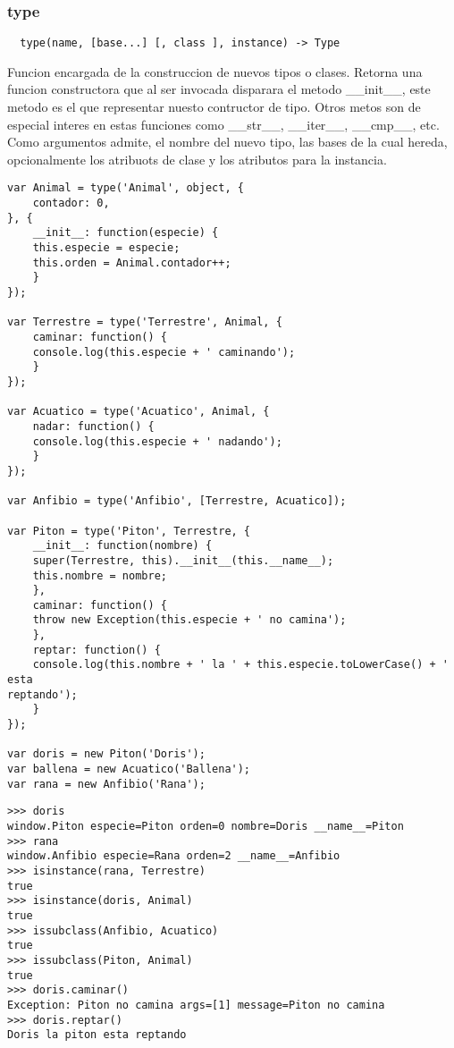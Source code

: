 \subsubsection*{type}
\begin{verbatim}
  type(name, [base...] [, class ], instance) -> Type
\end{verbatim} 
Funcion encargada de la construccion de nuevos tipos o clases.
Retorna una funcion constructora que al ser invocada disparara el metodo
__init__, este metodo es el que representar nuesto contructor de tipo. Otros
metos son de especial interes en estas funciones como __str__, __iter__,
__cmp__, etc.
Como argumentos admite, el nombre del nuevo tipo, las bases de la cual hereda,
opcionalmente los atribuots de clase y los atributos para la instancia.
\begin{lstlisting}[style=javascript,label=definicion-de-tipos,caption=Definicion
de tipos]
var Animal = type('Animal', object, {
    contador: 0,
}, {
    __init__: function(especie) {
	this.especie = especie;
	this.orden = Animal.contador++;
    }
});

var Terrestre = type('Terrestre', Animal, {
    caminar: function() {
	console.log(this.especie + ' caminando');
    }
});

var Acuatico = type('Acuatico', Animal, {
    nadar: function() {
	console.log(this.especie + ' nadando');
    }
});

var Anfibio = type('Anfibio', [Terrestre, Acuatico]);

var Piton = type('Piton', Terrestre, {
    __init__: function(nombre) {
	super(Terrestre, this).__init__(this.__name__);
	this.nombre = nombre;
    },
    caminar: function() {
	throw new Exception(this.especie + ' no camina');
    },
    reptar: function() {
	console.log(this.nombre + ' la ' + this.especie.toLowerCase() + ' esta
reptando');
    }
});

var doris = new Piton('Doris');
var ballena = new Acuatico('Ballena');
var rana = new Anfibio('Rana');
\end{lstlisting}
\begin{lstlisting}[style=consola]
>>> doris
window.Piton especie=Piton orden=0 nombre=Doris __name__=Piton
>>> rana
window.Anfibio especie=Rana orden=2 __name__=Anfibio
>>> isinstance(rana, Terrestre)
true
>>> isinstance(doris, Animal)
true
>>> issubclass(Anfibio, Acuatico)
true
>>> issubclass(Piton, Animal)
true
>>> doris.caminar()
Exception: Piton no camina args=[1] message=Piton no camina
>>> doris.reptar()
Doris la piton esta reptando
\end{lstlisting}

